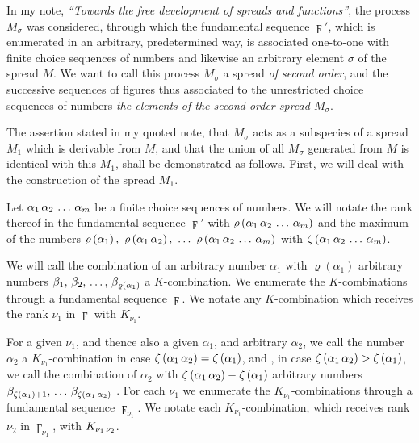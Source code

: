 \documentclass{amsart}
\newcommand\Rank[1]{\varrho\left(#1\right)}
\newcommand\Max[1]{\zeta\left(#1\right)}
\begin{document}


In my note, \emph{``Towards the free development of spreads and
functions''}, the process $M_\sigma$ was considered, through which
the fundamental sequence $\digamma'$, which is enumerated in an arbitrary,
predetermined way, is associated one-to-one with finite choice sequences of
numbers and likewise an arbitrary element $\sigma$ of the spread $M$. We want to call this process $M_\sigma$ a
spread \emph{of second order}, and the successive sequences of figures thus
associated to the unrestricted choice sequences of numbers  \emph{the elements of the second-order spread $M_\sigma$}.

The assertion stated in my quoted note, that $M_\sigma$ acts as a subspecies of
a spread $M_1$ which is derivable from $M$, and that the union of all
$M_\sigma$ generated from $M$ is identical with this $M_1$, shall be
demonstrated as follows. First, we will deal with the construction of the
spread $M_1$.

Let $\Sequence{\alpha_1, \alpha_2, \dots, \alpha_m}$ be a finite choice
sequences of numbers. We will notate the rank thereof in the fundamental
sequence $\digamma'$ with $\Rank{\Sequence{\alpha_1,\alpha_2,\dots,\alpha_m}}$
and the maximum of the numbers $\Rank{\alpha_1},\
\Rank{\Sequence{\alpha_1,\alpha_2}},\ \dots\
\Rank{\Sequence{\alpha_1,\alpha_2,\dots,\alpha_m}}$ with
$\Max{\Sequence{\alpha_1,\alpha_2,\dots,\alpha_m}}$.

We will call the combination of an arbitrary number $\alpha_1$ with
$\Rank{\alpha_1}$ arbitrary numbers
$\Sequence[,\,]{\beta_1,\beta_2,\dots,\beta_{\Rank{\alpha_1}}}$ a $K$-combination. We
enumerate the $K$-combinations through a fundamental sequence $\digamma$. We
notate any $K$-combination which receives the rank $\nu_1$ in $\digamma$ with
$K_{\nu_1}$.

For a given $\nu_1$, and thence also a given $\alpha_1$, and arbitrary
$\alpha_2$, we call the number $\alpha_2$ a $K_{\nu_1}$-combination in case
$\Max{\Sequence{\alpha_1,\alpha_2}} = \Max{\alpha_1}$, and ,
in case $\Max{\Sequence{\alpha_1,\alpha_2}} > \Max{\alpha_1}$, we call the
combination of $\alpha_2$ with $\Max{\Sequence{\alpha_1,\alpha_2}} -
\Max{\alpha_1}$ arbitrary numbers
$\beta_{\Max{\alpha_1}+1},\,\dots\,\beta_{\Max{\Sequence{\alpha_1,\alpha_2}}}$
\EdMark{a $K_{\nu_1}$-combination}. For each $\nu_1$ we enumerate the
$K_{\nu_1}$-combinations through a fundamental sequence $\digamma_{\nu_1}$. We
notate each $K_{\nu_1}$-combination, which receives rank $\nu_2$ in
$\digamma_{\nu_1}$, with $K_{\Sequence{\nu_1,\nu_2}}$.
\end{document}
